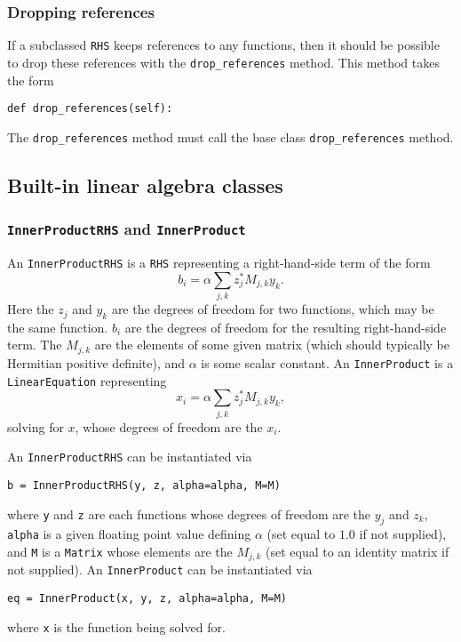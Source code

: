 \documentclass[11pt]{article}
\begin{document}
\subsubsection{Dropping references}

If a subclassed \texttt{RHS} keeps references to any functions, then it should
be possible to drop these references with the \texttt{drop\_references} method.
This method takes the form
\begin{lstlisting}
def drop_references(self):
\end{lstlisting}
The \texttt{drop\_references} method must call the base class
\texttt{drop\_references} method.

\subsection{Built-in linear algebra classes}

\subsubsection{\texttt{InnerProductRHS} and \texttt{InnerProduct}}

An \texttt{InnerProductRHS} is a \texttt{RHS} representing a right-hand-side
term of the form
\begin{equation*}
  b_i = \alpha \sum_{j,k} z_j^* M_{j,k} y_k.
\end{equation*}
Here the $z_j$ and $y_k$ are the degrees of freedom for two functions, which
may be the same function. $b_i$ are the degrees of freedom for the resulting
right-hand-side term. The $M_{j,k}$ are the elements of some given matrix
(which should typically be Hermitian positive definite), and $\alpha$ is some
scalar constant. An \texttt{InnerProduct} is a \texttt{LinearEquation}
representing
\begin{equation*}
  x_i = \alpha \sum_{j,k} z_j^* M_{j,k} y_k,
\end{equation*}
solving for $x$, whose degrees of freedom are the $x_i$.

An \texttt{InnerProductRHS} can be instantiated via
\begin{lstlisting}
b = InnerProductRHS(y, z, alpha=alpha, M=M)
\end{lstlisting}
where \texttt{y} and \texttt{z} are each functions whose degrees of freedom are
the $y_j$ and $z_k$, \texttt{alpha} is a given floating point value defining
$\alpha$ (set equal to $1.0$ if not supplied), and \texttt{M} is a
\texttt{Matrix} whose elements are the $M_{j,k}$ (set equal to an identity
matrix if not supplied). An \texttt{InnerProduct} can be instantiated via
\begin{lstlisting}
eq = InnerProduct(x, y, z, alpha=alpha, M=M)
\end{lstlisting}
where \texttt{x} is the function being solved for.
\end{document}

